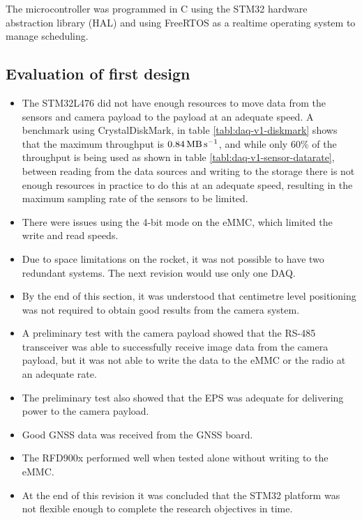 \documentclass[]{report}
\begin{document}
The microcontroller was programmed in C using the STM32 hardware abstraction library (HAL) and using FreeRTOS as a realtime operating system to manage scheduling.

\subsection{Evaluation of first design}

\begin{itemize}
  \item The STM32L476 did not have enough resources to move data from the sensors and camera payload to the payload at an adequate speed. A benchmark using CrystalDiskMark, in table \ref{tabl:daq-v1-diskmark} shows that the maximum throughput is $\SI{0.84}{\mega\byte\per\second}$, and while only 60\% of the throughput is being used as shown in table \ref{tabl:daq-v1-sensor-datarate}, between reading from the data sources and writing to the storage there is not enough resources in practice to do this at an adequate speed, resulting in the maximum sampling rate of the sensors to be limited.
  \item There were issues using the 4-bit mode on the eMMC, which limited the write and read speeds.
  \item Due to space limitations on the rocket, it was not possible to have two redundant systems. The next revision would use only one DAQ.
  \item By the end of this section, it was understood that centimetre level positioning was not required to obtain good results from the camera system.
  \item A preliminary test with the camera payload showed that the RS-485 transceiver was able to successfully receive image data from the camera payload, but it was not able to write the data to the eMMC or the radio at an adequate rate.
  \item The preliminary test also showed that the EPS was adequate for delivering power to the camera payload.
  \item Good GNSS data was received from the GNSS board.
  \item The RFD900x performed well when tested alone without writing to the eMMC.
  \item At the end of this revision it was concluded that the STM32 platform was not flexible enough to complete the research objectives in time.
\end{itemize}
\end{document}
